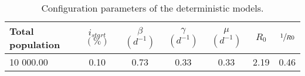 \begin{table}[h]
\centering
\caption{Configuration parameters of the deterministic models.}
\label{tab:params}
\begin{tabular}{lcccccc}
\toprule
Total population & $i_{start}$ $(\%)$ & $\beta $ $(d^{-1})$ & $\gamma $ $(d^{-1})$ & $\mu$ $(d^{-1})$ & $R_0$ & $\sfrac{1}{R0}$\\
\midrule
10 000.00 & 0.10 &   0.73 &   0.33 &   0.33 &  2.19 &  0.46\\
\bottomrule
\end{tabular}
\end{table}
